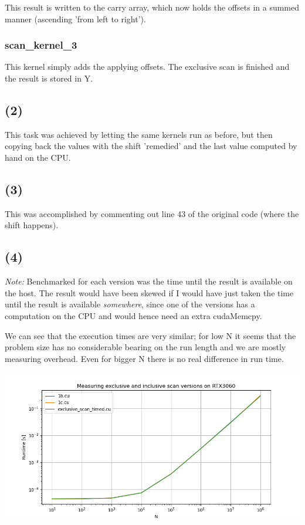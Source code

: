 \documentclass[11pt]{article}
\begin{document}
This result is written to the carry array, which now holds the offsets in a summed manner (ascending 'from left to right').

\subsubsection{scan_kernel_3}

This kernel simply adds the applying offsets. The exclusive scan is finished and the result is stored in Y.

\subsection{(2)}

This task was achieved by letting the same kernels run as before, but then copying back the values with the shift 'remedied' and the last value computed by hand on the CPU.

\subsection{(3)}

This was accomplished by commenting out line 43 of the original code (where the shift happens).

\subsection{(4)}

\textit{Note:} Benchmarked for each version was the time until the result is available on the host. The result would have been skewed if I would have just taken the time until the result is available \textit{somewhere}, since one of the versions has a computation on the CPU and would hence need an extra cudaMemcpy.

We can see that the execution times are very similar; for low N it seems that the problem size has no considerable bearing on the run length and we are mostly measuring overhead. Even for bigger N there is no real difference in run time.

\includegraphics[scale=0.5]{plots/1global.png}
\end{document}
